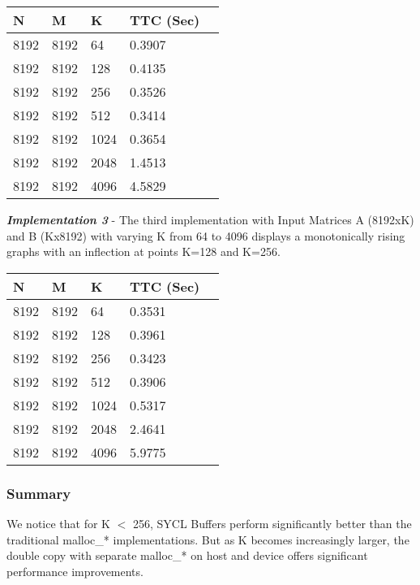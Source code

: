 \documentclass[14pt,fleqn]{article}
\begin{document}
\begin{center}
\begin{tabular}{|l|l|l|l|l|}                                   
    \hline\hline         
    N  & M & K & TTC (Sec) \\
    \hline\hline
    8192 & 8192 & 64 & 0.3907 \\ \hline
    8192 & 8192 & 128 & 0.4135 \\ \hline
    8192 & 8192 & 256 & 0.3526 \\ \hline
    8192 & 8192 & 512 & 0.3414 \\ \hline
    8192 & 8192 & 1024 & 0.3654 \\ \hline
    8192 & 8192 & 2048 & 1.4513 \\ \hline
    8192 & 8192 & 4096 & 4.5829 \\ \hline

\end{tabular}
\end{center}

\textit{\textbf{Implementation 3}} - The third implementation with Input Matrices A (8192xK) and B (Kx8192) with varying K from 64 to 4096 displays a monotonically rising graphs with an inflection at points K=128 and K=256.\\

\begin{center}
\begin{tabular}{|l|l|l|l|l|}                                   
    \hline\hline         
    N  & M & K & TTC (Sec) \\
    \hline\hline
    8192 & 8192 & 64 & 0.3531 \\ \hline
    8192 & 8192 & 128 & 0.3961 \\ \hline
    8192 & 8192 & 256 & 0.3423 \\ \hline
    8192 & 8192 & 512 & 0.3906 \\ \hline
    8192 & 8192 & 1024 & 0.5317 \\ \hline
    8192 & 8192 & 2048 & 2.4641 \\ \hline
    8192 & 8192 & 4096 & 5.9775 \\ \hline

\end{tabular}
\end{center}

\subsubsection{Summary}
We notice that for K $<$ 256, SYCL Buffers perform significantly better than the traditional malloc\_* implementations. But as K becomes increasingly larger, the double copy with separate malloc\_* on host and device offers significant performance improvements.\\
\end{document}
